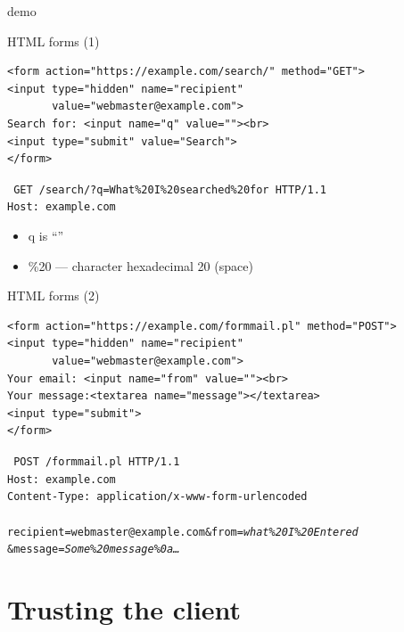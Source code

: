 \begin{frame}{demo}
\end{frame}

\begin{frame}[fragile,label=HTMLForms1]{HTML forms (1)}
\begin{verbatim}
<form action="https://example.com/search/" method="GET">
<input type="hidden" name="recipient"
       value="webmaster@example.com">
Search for: <input name="q" value=""><br>
<input type="submit" value="Search">
</form>
\end{verbatim}
\begin{framed}
\tt\small
GET /search/?q=What\%20I\%20searched\%20for HTTP/1.1 \\
Host: example.com
\end{framed}
    \begin{itemize}
        \item q is ``''
        \item \%20 --- character hexadecimal 20 (space)
    \end{itemize}
\end{frame}

\begin{frame}[fragile,label=HTMLForms2]{HTML forms (2)}
\begin{verbatim}
<form action="https://example.com/formmail.pl" method="POST">
<input type="hidden" name="recipient"
       value="webmaster@example.com">
Your email: <input name="from" value=""><br>
Your message:<textarea name="message"></textarea>
<input type="submit">
</form>
\end{verbatim}
\begin{framed}
\tt\small
POST /formmail.pl HTTP/1.1 \\
Host: example.com \\
Content-Type: application/x-www-form-urlencoded \\
~ \\
recipient=webmaster@example.com\&from=\textit{what\%20I\%20Entered}\\\&message=\textit{Some\%20message\%0a\ldots} \\
\end{framed}
\end{frame}


\section{Trusting the client}

